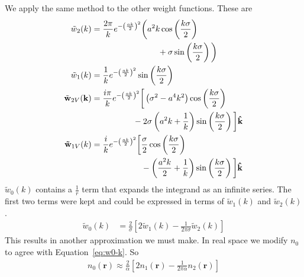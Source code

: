 \documentclass[letterpaper,twocolumn,amsmath,amssymb,prb]{revtex4-1}
\newcommand{\rr}{\textbf{r}}
\newcommand{\kk}{\textbf{k}}
\begin{document}
We apply the same method to the other weight functions. These are
\begin{align}
  \tilde{w}_2(k) &=\frac{2\pi}{k} e^{-\left(\frac{ak}{2} \right)^2}
  \bigg(a^2 k \cos\left(\frac{k\sigma}{2}\right) \notag \\
  & \hspace{8em}+\sigma \sin\left(\frac{k\sigma}{2}\right) \bigg) \\ 
  \tilde{w}_1(k) &=
  \frac{1}{k}e^{-\left(\frac{ak}{2} \right)^2}
  \sin\left(\frac{k\sigma}{2}\right) \\
  \tilde{\mathbf{w}}_{2V}(\kk) &=
  \frac{i \pi}{k} e^{-\left(\frac{ak}{2} \right)^2}\bigg[ \left(\sigma^2 - a^4k^2\right)
    \cos\left(\frac{k\sigma}{2}\right) \notag\\ 
    & \hspace{5em}- 2\sigma \left(a^2k + \frac{1}{k}
    \right)\sin\left(\frac{k\sigma}{2}\right) \bigg]
  \mathbf{\hat{k}} \\ 
  \mathbf{\tilde{w}}_{1V}(k)&= \frac{i}{k}
   e^{-\left(\frac{ak}{2} \right)^2} \bigg[ \frac{\sigma}{2}
    \cos\left(\frac{k\sigma}{2}\right) \notag\\
    & \hspace{6em}- \left( \frac{a^2k}{2} +
    \frac{1}{k} \right) \sin\left(\frac{k\sigma}{2}\right) \bigg]
  \mathbf{\hat{k}}
\end{align}
$\tilde{w}_0(k)$ contains a $\frac{1}{r}$ term that expands the
integrand  as an infinite series. The first two terms were kept and
could be expressed in terms of $\tilde{w}_1(k)$ and
$\tilde{w}_2(k)$.
\begin{align}
  \tilde{w}_0(k) &= \frac{2}{\sigma} \left[2\tilde{w}_1(k) - \frac{1}{2 \pi
      \sigma}\tilde{w}_2(k) \right]
  \label{eq:w0-k}
\end{align}
This results in another approximation we must make. In real space we modify $n_0$ to agree with Equation~\ref{eq:w0-k}. So
\begin{align} 
 n_0(\rr) \approx \frac{2}{\alpha} \left[2 n_1(\rr) - \frac{1}{2
     \pi \alpha} n_2(\rr) \right]
\end{align}

\end{document}
